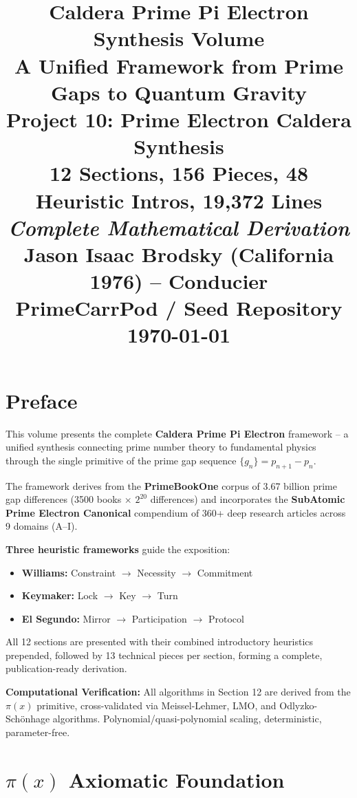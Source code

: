 \documentclass[11pt,a4paper]{book}
\title{
    \vspace{2cm}
    {\Huge \textbf{Caldera Prime Pi Electron Synthesis Volume}}\\[1cm]
    {\Large A Unified Framework from Prime Gaps to Quantum Gravity}\\[1.5cm]
    {\large \textbf{Project 10: Prime Electron Caldera Synthesis}}\\[0.5cm]
    {\normalsize 12 Sections, 156 Pieces, 48 Heuristic Intros, 19,372 Lines}\\[1cm]
    {\normalsize \textit{Complete Mathematical Derivation}}\\[2cm]
    {\large Jason Isaac Brodsky (California 1976) -- Conducier}\\
    {\normalsize PrimeCarrPod / Seed Repository}\\
    {\normalsize \today}
}
\date{}
\author{}
\begin{document}
\maketitle

\thispagestyle{empty}
\newpage

\tableofcontents
\newpage

\listoffigures
\listoftables
\newpage

\chapter*{Preface}

This volume presents the complete \textbf{Caldera Prime Pi Electron} framework -- a unified synthesis connecting prime number theory to fundamental physics through the single primitive of the prime gap sequence $\{g_n\} = p_{n+1} - p_n$.

The framework derives from the \textbf{PrimeBookOne} corpus of 3.67 billion prime gap differences (3500 books $\times$ $2^{20}$ differences) and incorporates the \textbf{SubAtomic Prime Electron Canonical} compendium of 360+ deep research articles across 9 domains (A--I).

\textbf{Three heuristic frameworks} guide the exposition:
\begin{itemize}
    \item \textbf{Williams:} Constraint $\to$ Necessity $\to$ Commitment
    \item \textbf{Keymaker:} Lock $\to$ Key $\to$ Turn
    \item \textbf{El Segundo:} Mirror $\to$ Participation $\to$ Protocol
\end{itemize}

All 12 sections are presented with their combined introductory heuristics prepended, followed by 13 technical pieces per section, forming a complete, publication-ready derivation.

\vspace{1cm}
\noindent\textbf{Computational Verification:} All algorithms in Section 12 are derived from the $\pi(x)$ primitive, cross-validated via Meissel-Lehmer, LMO, and Odlyzko-Sch\"onhage algorithms. Polynomial/quasi-polynomial scaling, deterministic, parameter-free.

\newpage

\chapter{$\pi(x)$ Axiomatic Foundation}

\end{document}
